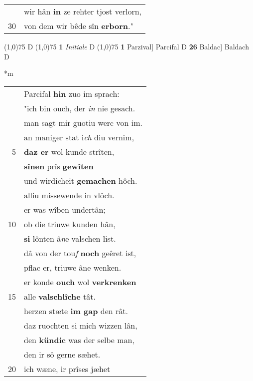 \documentclass[8pt,a4paper,notitlepage]{article}
\begin{document}
\begin{table}[ht]
\begin{minipage}[t]{0.5\linewidth}
\begin{tabular}{rl}
 & wir hân \textbf{in} ze rehter tjost verlorn,\\ 
30 & von dem wir bêde sîn \textbf{erborn}."\\ 
\end{tabular}
\scriptsize
\line(1,0){75} \newline
D \newline
\line(1,0){75} \newline
\textbf{1} \textit{Initiale} D  \newline
\line(1,0){75} \newline
\textbf{1} Parzival] Parcifal D \textbf{26} Baldac] Baldach D \newline
\end{minipage}
\hspace{0.5cm}
\begin{minipage}[t]{0.5\linewidth}
\small
\begin{center}*m
\end{center}
\begin{tabular}{rl}
 & Parcifal \textbf{hin} zuo im sprach:\\ 
 & "ich bin ouch, der \textit{in} nie gesach.\\ 
 & man sagt mir guotiu werc von im.\\ 
 & an maniger stat i\textit{ch} diu vernim,\\ 
5 & \textbf{daz er} wol kunde strîten,\\ 
 & \textbf{sînen} prîs \textbf{gewîten}\\ 
 & und wirdicheit \textbf{gemachen} hôch.\\ 
 & alliu missewende in vlôch.\\ 
 & er was wîben undertân;\\ 
10 & ob die triuwe kunden hân,\\ 
 & \textbf{si} lônten â\textit{n}e valschen list.\\ 
 & dâ von der tou\textit{f} \textbf{noch} geêret ist,\\ 
 & pflac er, triuwe âne wenken.\\ 
 & er konde \textbf{ouch} wol \textbf{verkrenken}\\ 
15 & alle \textbf{valschlîche} tât.\\ 
 & herzen stæte \textbf{im gap} den rât.\\ 
 & daz ruochten si mich wizzen lân,\\ 
 & den \textbf{kündic} was der selbe man,\\ 
 & den ir sô gerne sæhet.\\ 
20 & ich wæne, ir prîses jæhet\\ 

\end{tabular}
\end{minipage}
\end{table}
\end{document}
